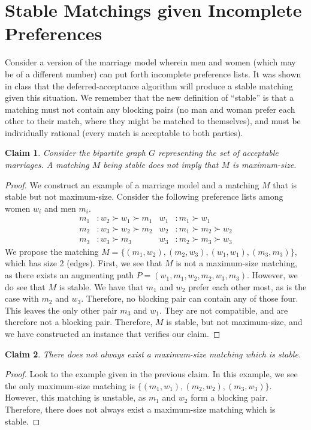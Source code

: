 \documentclass[12pt]{article}
\newtheorem*{claim}{Claim}
\begin{document}
\section{Stable Matchings given Incomplete Preferences}
Consider a version of the marriage model wherein men and women (which may be of a different number) can put forth incomplete preference lists. It was shown in class that the deferred-acceptance algorithm will produce a stable matching given this situation. We remember that the new definition of ``stable'' is that a matching must not contain any blocking pairs (no man and woman prefer each other to their match, where they might be matched to themselves), and must be individually rational (every match is acceptable to both parties).
\begin{claim}
Consider the bipartite graph $G$ representing the set of acceptable marriages. A matching $M$ being stable does not imply that $M$ is maximum-size.
\end{claim}
\begin{proof}
We construct an example of a marriage model and a matching $M$ that is stable but not maximum-size.
Consider the following preference lists among women $w_i$ and men $m_i$.
\begin{align*}
m_1 &: w_2 \succ w_1 \succ m_1 & w_1 &: m_1 \succ w_1\\
m_2 &: w_3 \succ w_2 \succ m_2 & w_2 &: m_1 \succ m_2 \succ w_2\\
m_3 &: w_3 \succ m_3           & w_3 &: m_2 \succ m_3 \succ w_3
\end{align*}
We propose the matching $M = \{(m_1, w_2), (m_2, w_3), (w_1, w_1), (m_3, m_3)\}$, which has size 2 (edges). First, we see that $M$ is not a maximum-size matching, as there exists an augmenting path $P = (w_1, m_1, w_2, m_2, w_3, m_3)$. However, we do see that $M$ is stable. We have that $m_1$ and $w_2$ prefer each other most, as is the case with $m_2$ and $w_3$. Therefore, no blocking pair can contain any of those four. This leaves the only other pair $m_3$ and $w_1$. They are not compatible, and are therefore not a blocking pair. Therefore, $M$ is stable, but not maximum-size, and we have constructed an instance that verifies our claim.
\end{proof}

\begin{claim}
There does not always exist a maximum-size matching which is stable.
\end{claim}
\begin{proof}
Look to the example given in the previous claim. In this example, we see the only maximum-size matching is $\{(m_1, w_1), (m_2, w_2), (m_3, w_3)\}$. However, this matching is unstable, as $m_1$ and $w_2$ form a blocking pair. Therefore, there does not always exist a maximum-size matching which is stable.
\end{proof}
\end{document}
